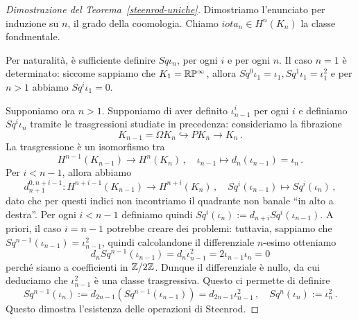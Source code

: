

\begin{proof}[Dimostrazione del Teorema~\ref{steenrod-uniche}]
	Dimostriamo l'enunciato per induzione su $n$, il grado della coomologia.
	Chiamo $iota_{n} \in H^{n}(K_{n})$ la classe fondmentale.
	
	Per naturalità, è sufficiente definire $Sq \iota_{n}$, per ogni $i$ e per ogni $n$.
	Il caso $n=1$ è determinato: siccome sappiamo che $K_{1}={\mathbb R}\mathbb{P}^{\infty}$,
	allora $Sq^{0}\iota_{1} = \iota_{1}, Sq^{1}\iota_{1} = \iota_{1}^{2}$
	e per $n > 1$ abbiamo $Sq^{i}\iota_{1}=0$.
	
	Supponiamo ora $n>1$. Supponiamo di aver definito $\iota^{i}_{n-1}$ per ogni $i$
	e definiamo $Sq^{i}\iota_{n}$ tramite le trasgressioni studiate in precedenza:
	consideriamo la fibrazione
	\begin{equation*}
		K_{n-1} = \Omega K_{n} \hookrightarrow PK_{n} \longrightarrow K_{n}\,.
	\end{equation*}
	La trasgressione è un isomorfismo tra
	\begin{equation*}
		H^{n-1}(K_{n-1}) \longrightarrow H^{n}(K_{n})\,, \quad
		\iota_{n-1} \longmapsto d_{n}(\iota_{n-1}) = \iota_{n}\,.
	\end{equation*}
	Per $i < n-1$, allora abbiamo
	\begin{equation*}
		d^{0,n+i-1}_{n+1} : H^{n+i-1}(K_{n-1}) \longrightarrow H^{n+i}(K_{n})\,,
		\quad Sq^{i}(\iota_{n-1}) \longmapsto Sq^{i}(\iota_{n})\,,
	\end{equation*}
	dato che per questi indici non incontriamo il quadrante non banale ``in alto a destra''.
	Per ogni $i < n-1$ definiamo quindi $Sq^{i}(\iota_{n}) := d_{n+i}Sq^{i}(\iota_{n-1})$.
	A priori, il caso $i=n-1$ potrebbe creare dei problemi: tuttavia,
	sappiamo che $Sq^{n-1}(\iota_{n-1}) = \iota_{n-1}^{2}$, 
	quindi calcolandone il differenziale $n$-esimo otteniamo
	\begin{equation*}
		d_{n}Sq^{n-1}(\iota_{n-1}) = d_{n}\iota_{n-1}^{2} = 2 \iota_{n-1}\iota_{n} = 0
	\end{equation*}
	perché siamo a coefficienti in ${\mathbb Z}/2{\mathbb Z}$. Dunque il differenziale è nullo,
	da cui deduciamo che $\iota_{n-1}^{2}$ è una classe trasgressiva.
	Questo ci permette di definire
	\begin{equation*}
		Sq^{n-1}(\iota_{n}) := d_{2n-1}(Sq^{n-1}(\iota_{n-1})) = d_{2n-1}\iota_{n-1}^{2}\,,
		\quad Sq^{n}(\iota_{n}) := \iota_{n}^{2}\,.
	\end{equation*}
	Questo dimostra l'esistenza delle operazioni di Steenrod.
	

\end{proof}
